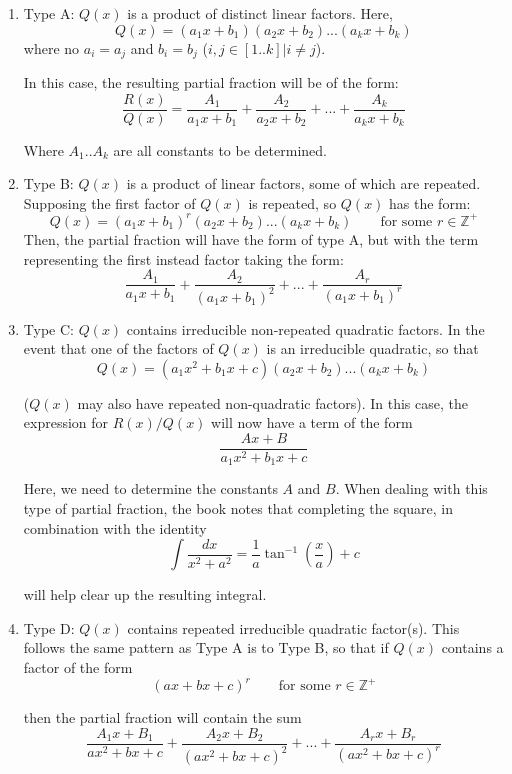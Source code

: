\documentclass[10pt,a4paper]{report}
\begin{document}
\begin{enumerate}
	\item Type A: $Q(x)$ is a product of distinct linear factors. Here, 
	$$
		Q(x) = (a_1 x + b_1)(a_2 x + b_2)...(a_k x+ b_k)
	$$
	where no $a_i = a_j$ and $b_i = b_j$ ($i, j \in [1..k] | i \ne j$).

	In this case, the resulting partial fraction will be of the form:
	$$
		\frac{R(x)}{Q(x)} = \frac{A_1}{a_1x + b_1} + \frac{A_2}{a_2 x + b_2} + ... + \frac{A_k}{a_k x + b_k}
	$$

	Where $A_1 .. A_k$ are all constants to be determined.

	\item Type B: $Q(x)$ is a product of linear factors, some of which are repeated. Supposing the first factor of $Q(x)$ is repeated, so $Q(x)$ has the form:
	$$
		Q(x) = (a_1 x + b_1)^r(a_2 x + b_2)...(a_k x+ b_k) \qquad \text{for some } r \in \mathbb{Z^+}
	$$
	Then, the partial fraction will have the form of type A, but with the term representing the first instead factor taking the form:
	$$
		\frac{A_1}{a_1x + b_1} + \frac{A_2}{(a_1 x + b_1)^2} + ... + \frac{A_r}{(a_1 x + b_1)^r}
	$$

	\item Type C: $Q(x)$ contains irreducible non-repeated quadratic factors. In the event that one of the factors of $Q(x)$ is an irreducible quadratic, so that
	$$
		Q(x) = (a_1 x^2 + b_1x + c)(a_2 x + b_2)...(a_k x+ b_k)
	$$

	($Q(x)$ may also have repeated non-quadratic factors). In this case, the expression for $R(x)/Q(x)$ will now have a term of the form
	$$
		\frac{Ax + B}{a_1 x^2 + b_1x + c}
	$$

	Here, we need to determine the constants $A$ and $B$. When dealing with this type of partial fraction, the book notes that completing the square, in combination with the identity
	$$
		\int \frac{dx}{x^2 + a^2} = \frac{1}{a} \tan^{-1} \left( \frac{x}{a} \right) + c
	$$

	will help clear up the resulting integral.

	\item Type D: $Q(x)$ contains repeated irreducible quadratic factor(s). This follows the same pattern as Type A is to Type B, so that if $Q(x)$ contains a factor of the form
	$$
		(ax + bx + c)^r \qquad \text{for some } r \in \mathbb{Z^+}
	$$

	then the partial fraction will contain the sum
	$$
		\frac{A_1 x + B_1}{ax^2 + bx + c} + \frac{A_2 x + B_2}{(ax^2 + bx + c)^2} + ... + \frac{A_r x + B_r}{(ax^2 + bx + c)^r}
	$$

\end{enumerate}
\end{document}
